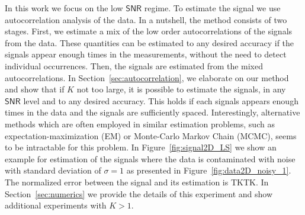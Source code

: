 \documentclass[english]{article}
\numberwithin{equation}{section}
\theoremstyle{plain}
\theoremstyle{definition}
\theoremstyle{remark}
\theoremstyle{plain}
\theoremstyle{remark}
\theoremstyle{plain}
\theoremstyle{plain}
\newcommand{\SNR}{{\textsf{SNR}}}
\begin{document}
In this work we focus on the low $\SNR$ regime. To estimate the signal we use autocorrelation analysis of the data. 
In a nutshell,
the method consists of two stages. First, we estimate a mix of the low order autocorrelations of the signals from the data. These quantities can
be estimated to any desired accuracy if the signals appear enough times in the measurements, without the need to detect individual occurrences. Then, the signals are estimated from the mixed autocorrelations.
In Section~\ref{sec:autocorrelation}, we elaborate on our method  and show that if $K$ not too large, it is possible to estimate the signals, in any $\SNR$ level and to any desired accuracy.
This holds if each signals appears enough times in the data and the signals are sufficiently spaced. 
Interestingly, alternative methods which are often employed in similar estimation problems, such as expectation-maximization (EM) or Monte-Carlo Markov Chain (MCMC), seems to be intractable for this problem. In Figure~\ref{fig:signal2D_LS} we show an example for estimation of the signals where the data is contaminated with noise with standard deviation of $\sigma=1$ as presented in Figure~\ref{fig:data2D_noisy_1}. The normalized error between the signal and its estimation is TKTK. In Section~\ref{sec:numerics} we provide the details of this experiment and show additional experiments with $K>1$. 
\end{document}
